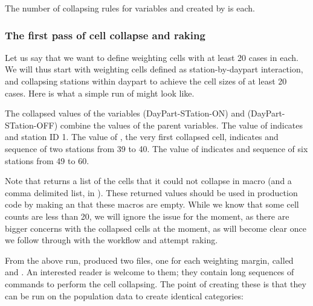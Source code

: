 \begin{stlog}
\nullskip
\end{stlog}

The number of collapsing rules for variables  and 
created by 
is \nullskip each.

\subsubsection{The first pass of cell collapse and raking}

Let us say that we want to define weighting cells with at least 20 cases in each.
We will thus start with weighting cells defined as station-by-daypart interaction,
and collapsing stations within daypart to achieve the cell sizes of at least 20 cases.
Here is what a simple run of  might look like.

\begin{stlog}
\nullskip
\end{stlog}

The collapsed values of the variables  (DayPart-STation-ON) and
 (DayPart-STation-OFF) combine the values of the parent variables. The value
of  indicates  and station ID 1.
The value of , the very first collapsed cell, indicates
 and sequence of two stations from 39 to 40.
The value of  indicates  and sequence of
six stations from 49 to 60.
\label{page:dpston:nomenclature}

Note that  returns a list of the cells that it could not
collapse in  macro (and a comma delimited list, in ).
These returned values should be used in production code by making an 
\citep{gould:2003:tip3} that these macros are empty.
While we know that some cell counts are less than 20, we will ignore the issue
for the moment, as there are bigger concerns with the collapsed cells at the moment,
as will become clear once we follow through with the workflow and attempt raking.

From the above run,  produced two files, one for each
weighting margin, called  and . An interested reader
is welcome to  them; they contain long sequences of 
commands to perform the cell collapsing. The point of creating these is that they
can be run on the population data to create identical categories:

